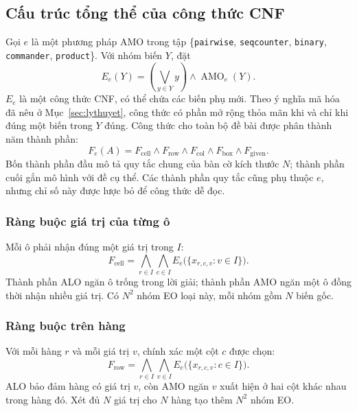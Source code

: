 \documentclass[a4paper,fleqn]{cas-sc}
\begin{document}
\subsection{Cấu trúc tổng thể của công thức CNF}

Gọi $e$ là một phương pháp AMO trong tập
\{\texttt{pairwise}, \texttt{seqcounter}, \texttt{binary},
\texttt{commander}, \texttt{product}\}. Với nhóm biến $Y$, đặt
\begin{equation}
 E_e(Y)=\left(\bigvee_{y\in Y}y\right)\land\operatorname{AMO}_e(Y).
 \label{eq:method-eo-encoder}
\end{equation}
$E_e$ là một công thức CNF, có thể chứa các biến phụ mới. Theo ý nghĩa
mã hóa đã nêu ở Mục~\ref{sec:lythuyet}, công thức có phần mở rộng thỏa
mãn khi và chỉ khi đúng một biến trong $Y$ đúng. Công thức cho toàn bộ
đề bài được phân thành năm thành phần:
\begin{equation}
 F_e(A)=F_{\mathrm{cell}}\land F_{\mathrm{row}}
       \land F_{\mathrm{col}}\land F_{\mathrm{box}}
       \land F_{\mathrm{given}}.
 \label{eq:method-full-formula}
\end{equation}
Bốn thành phần đầu mô tả quy tắc chung của bàn cờ kích thước $N$;
thành phần cuối gắn mô hình với đề cụ thể. Các thành phần quy tắc cũng
phụ thuộc $e$, nhưng chỉ số này được lược bỏ để công thức dễ đọc.

\subsubsection{Ràng buộc giá trị của từng ô}

Mỗi ô phải nhận đúng một giá trị trong $I$:
\begin{equation}
 F_{\mathrm{cell}}=
 \bigwedge_{r\in I}\bigwedge_{c\in I}
 E_e\bigl(\{x_{r,c,v}:v\in I\}\bigr).
 \label{eq:method-cell}
\end{equation}
Thành phần ALO ngăn ô trống trong lời giải; thành phần AMO ngăn một ô
đồng thời nhận nhiều giá trị. Có $N^2$ nhóm EO loại này, mỗi nhóm gồm
$N$ biến gốc.

\subsubsection{Ràng buộc trên hàng}

Với mỗi hàng $r$ và mỗi giá trị $v$, chính xác một cột $c$ được chọn:
\begin{equation}
 F_{\mathrm{row}}=
 \bigwedge_{r\in I}\bigwedge_{v\in I}
 E_e\bigl(\{x_{r,c,v}:c\in I\}\bigr).
 \label{eq:method-row}
\end{equation}
ALO bảo đảm hàng có giá trị $v$, còn AMO ngăn $v$ xuất hiện ở hai cột
khác nhau trong hàng đó. Xét đủ $N$ giá trị cho $N$ hàng tạo thêm
$N^2$ nhóm EO.
\end{document}
